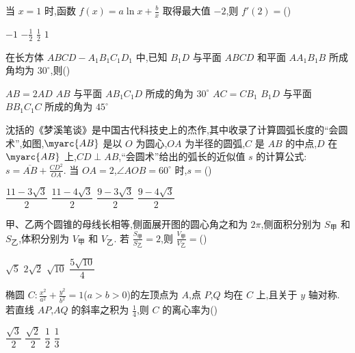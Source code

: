 \begin{problem}
当 \(x=1\) 时,函数 \(f(x)=a\ln x+\frac b x\) 取得最大值 \(-2\),则 \(f'(2)=\)(\quad)

\choices
    {\(-1\)}
    {\(-\frac12\)}
    {\(\frac12\)}
    {\(1\)}
\end{problem}

\begin{problem}
在长方体 \(ABCD-A_1B_1C_1D_1\) 中,已知 \(B_1D\) 与平面 \(ABCD\) 和平面 \(AA_1B_1B\) 所成角均为 \(30^\circ\),则(\quad)

\choices
    {\(AB=2AD\)}
    {\(AB\) 与平面 \(AB_1C_1D\) 所成的角为 \(30^\circ\)}
    {\(AC=CB_1\)}
    {\(B_1D\) 与平面 \(BB_1C_1C\) 所成的角为 \(45^\circ\)}
\end{problem}

\begin{problem}
沈括的《梦溪笔谈》是中国古代科技史上的杰作,其中收录了计算圆弧长度的``会圆术'',如图,\(\myarc{AB}\) 是以 \(O\) 为圆心,\(OA\) 为半径的圆弧,\(C\) 是 \(AB\) 的中点,\(D\) 在 \(\myarc{AB}\) 上,\(CD\perp AB\),``会圆术''给出的弧长的近似值 \(s\) 的计算公式:\(s=\overline{AB}+\frac{CD^2}{OA}\). 当 \(OA=2\),\(\angle AOB=60^\circ\) 时,\(s=\)(\quad)


\choices
    {\(\dfrac{11-3\sqrt3}{2}\)}
    {\(\dfrac{11-4\sqrt3}{2}\)}
    {\(\dfrac{9-3\sqrt3}{2}\)}
    {\(\dfrac{9-4\sqrt3}{2}\)}
\end{problem}

\begin{problem}
甲、乙两个圆锥的母线长相等,侧面展开图的圆心角之和为 \(2\pi\),侧面积分别为 \(S_{\text{甲}}\) 和 \(S_{\text{乙}}\),体积分别为 \(V_{\text{甲}}\) 和 \(V_{\text{乙}}\). 若 \(\frac{S_{\text{甲}}}{S_{\text{乙}}}=2\),则 \(\frac{V_{\text{甲}}}{V_{\text{乙}}}=\)(\quad)

\choices
    {\(\sqrt5\)}
    {\(2\sqrt2\)}
    {\(\sqrt{10}\)}
    {\(\dfrac{5\sqrt{10}}{4}\)}
\end{problem}

\begin{problem}
椭圆 \(C:\frac{x^2}{a^2}+\frac{y^2}{b^2}=1\)(\(a>b>0\))的左顶点为 \(A\),点 \(P\),\(Q\) 均在 \(C\) 上,且关于 \(y\) 轴对称. 若直线 \(AP\),\(AQ\) 的斜率之积为 \(\frac14\),则 \(C\) 的离心率为(\quad)

\choices
    {\( \dfrac{\sqrt3}{2}\)}
    {\( \dfrac{\sqrt2}{2}\)}
    {\( \dfrac{1}{2}\)}
    {\(\dfrac{1}{3}\)}
\end{problem}

